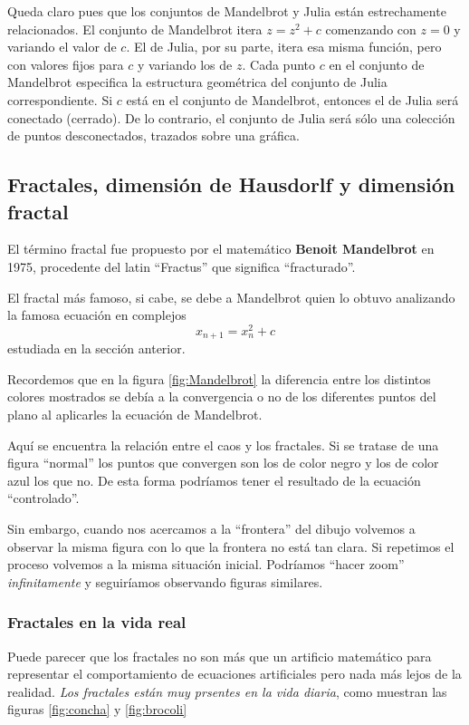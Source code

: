 Queda claro pues que los conjuntos de Mandelbrot y Julia están estrechamente relacionados. El conjunto de Mandelbrot itera $z=z^2+c$ comenzando con $z = 0$ y variando el valor de $c$. El de Julia, por su parte, itera esa misma función, pero con valores fijos para $c$ y variando los de $z$. Cada punto $c$ en el conjunto de Mandelbrot especifica la estructura geométrica del conjunto de Julia correspondiente. Si $c$ está en el conjunto de Mandelbrot, entonces el de Julia será conectado (cerrado). De lo contrario, el conjunto de Julia será sólo una colección de puntos desconectados, trazados sobre una gráfica.

\subsection{Fractales, dimensión de Hausdorlf y dimensión fractal}

El término fractal fue propuesto por el matemático \textbf{Benoit Mandelbrot} en 1975, procedente del latin ``Fractus'' que significa ``fracturado''.

El fractal más famoso, si cabe, se debe a Mandelbrot quien lo obtuvo analizando la famosa ecuación en complejos
\[x_{n+1} = x_n^2 + c\]
estudiada en la sección anterior.

Recordemos que en la figura \ref{fig:Mandelbrot} la diferencia entre los distintos colores mostrados se debía a la convergencia o no de los diferentes puntos del plano al aplicarles la ecuación de Mandelbrot.

Aquí se encuentra la relación entre el caos y los fractales. Si se tratase de una figura ``normal'' los puntos que convergen son los de color negro y los de color azul los que no. De esta forma podríamos tener el resultado de la ecuación ``controlado''.

Sin embargo, cuando nos acercamos a la ``frontera'' del dibujo volvemos a observar la misma figura con lo que la frontera no está tan clara. Si repetimos el proceso volvemos a la misma situación inicial. Podríamos ``hacer zoom'' \emph{infinitamente} y seguiríamos observando figuras similares.

\subsubsection{Fractales en la vida real}
Puede parecer que los fractales no son más que un artificio matemático para representar el comportamiento de ecuaciones artificiales pero nada más lejos de la realidad. \emph{Los fractales están muy prsentes en la vida diaria}, como muestran las figuras \ref{fig:concha} y \ref{fig:brocoli}

